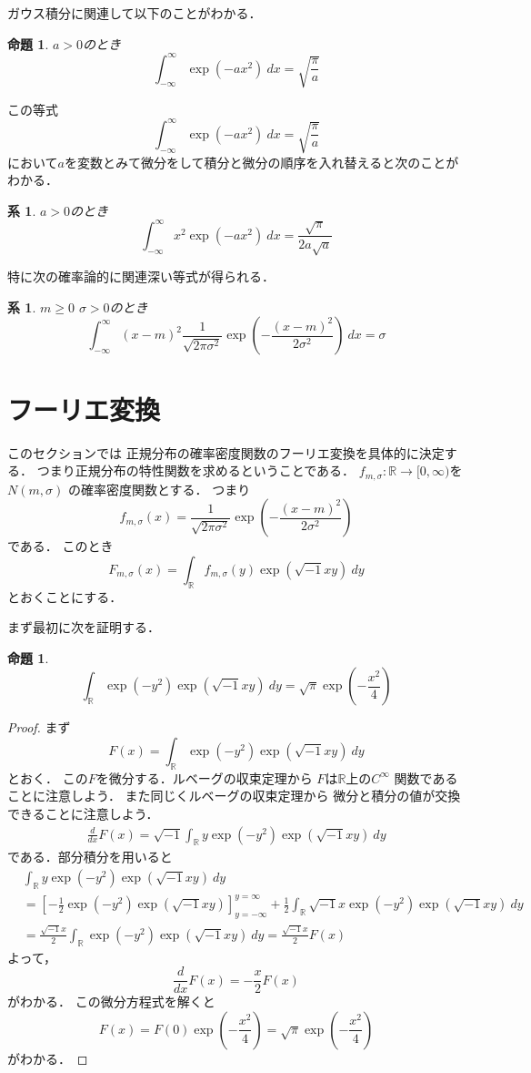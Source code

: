 \documentclass[leqno, 12pt]{jsarticle}
\newtheorem{prop}[thm]{命題}
\newtheorem{cor}[thm]{系}
\newcommand{\rr}{\mathbb{R}}
\begin{document}
ガウス積分に関連して以下のことがわかる．
\begin{prop}
$a>0$のとき
\[
\int_{-\infty}^{\infty}\exp(-ax^2)\ dx=\sqrt{\frac{\pi}{a}}
\]
\end{prop}

この等式
\[
\int_{-\infty}^{\infty}\exp(-ax^2)\ dx=\sqrt{\frac{\pi}{a}}
\]
において$a$を変数とみて微分をして積分と微分の順序を入れ替えると次のことがわかる．

\begin{cor}
$a>0$のとき
\[
\int_{-\infty}^{\infty}x^2\exp(-ax^2)\ dx=\frac{\sqrt{\pi}}{2a\sqrt{a}}
\]
\end{cor}
特に次の確率論的に関連深い等式が得られる．
\begin{cor}
$m\ge 0$
$\sigma>0$のとき
\[
	\int_{-\infty}^{\infty}
	(x-m)^2
	\frac{1}{\sqrt{2\pi\sigma^2}}
	\exp\left(-\frac{(x-m)^2}{2\sigma^2}\right)\ dx
	=
	\sigma
\]
\end{cor}

\section{フーリエ変換}
このセクションでは
正規分布の確率密度関数のフーリエ変換を具体的に決定する．
つまり正規分布の特性関数を求めるということである．
$f_{m, \sigma}: \rr\to [0, \infty)$を$N(m, \sigma)$
の確率密度関数とする．
つまり
\[
f_{m, \sigma}(x)=
\frac{1}{\sqrt{2\pi\sigma^2}}
\exp\left(-\frac{(x-m)^2}{2\sigma^2}\right)
\]
である．
このとき
\[
F_{m, \sigma}(x)=\int_{\rr}f_{m, \sigma}(y)\exp(\sqrt{-1}xy)\ dy
\]
とおくことにする．

まず最初に次を証明する．
\begin{prop}\label{prop:daiji}
\[
\int_{\rr}\exp(-y^2)\exp(\sqrt{-1}xy)\ dy
=
\sqrt{\pi}
\exp\left(-\frac{x^2}{4}\right)
\]
\end{prop}
\begin{proof}
まず
\[
F(x)=\int_{\rr}\exp(-y^2)\exp(\sqrt{-1}xy)\ dy
\]
とおく．
この$F$を微分する．ルベーグの収束定理から
$F$は$\rr$上の$C^{\infty}$
関数であることに注意しよう．
また同じくルベーグの収束定理から
微分と積分の値が交換できることに注意しよう．
\begin{align*}
	\frac{d}{dx}F(x)
	=
	\sqrt{-1}\int_{\rr}y\exp(-y^2)\exp(\sqrt{-1}xy)\ dy
\end{align*}
である．部分積分を用いると
\begin{align*}
	&\int_{\rr}y\exp(-y^2)\exp(\sqrt{-1}xy)\ dy
	\\
	&=
	\left[-\frac{1}{2}\exp(-y^2)\exp(\sqrt{-1}xy)\right]_{y=-\infty}^{y=\infty}
	+\frac{1}{2}\int_{\rr}\sqrt{-1}x\exp(-y^2)\exp(\sqrt{-1}xy)\ dy
	\\
	&=
	\frac{\sqrt{-1}x}{2}\int_{\rr}\exp(-y^2)\exp(\sqrt{-1}xy)\ dy
	=\frac{\sqrt{-1}x}{2}F(x)
\end{align*}
よって，
\[
\frac{d}{dx}F(x)=-\frac{x}{2}F(x)
\]
がわかる．
この微分方程式を解くと
\[
F(x)=F(0)\exp\left(-\frac{x^2}{4}\right)=\sqrt{\pi}\exp\left(-\frac{x^2}{4}\right)
\]
がわかる．
\end{proof}
\end{document}
